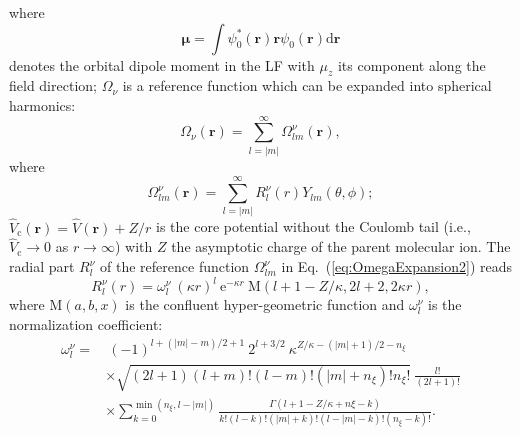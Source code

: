 \documentclass[preprint,12pt]{elsarticle} %
\newcommand{\bn}[1]{\mathbf{#1}}    %
\newcommand{\bi}[1]{\bm{#1}}        %
\renewcommand{\rm}[1]{\mathrm{#1}}    %
\newcommand{\dd}{\mathrm{d}}    %
\newcommand{\ee}{\mathrm{e}}    %
\newcommand{\abs}[1]{\lvert #1 \rvert}  %
\begin{document}
where
\begin{equation}
    \bi{\mu} = \int \psi_0^*(\bn{r}) \bn{r} \psi_0(\bn{r}) \dd \bn{r}
\end{equation}
denotes the orbital dipole moment in the LF with $\mu_z$ its component along the field direction;
$\Omega_\nu$ is a reference function which can be expanded into spherical harmonics:
\begin{equation}
    \Omega_\nu(\bn{r}) = \sum_{l=|m|}^{\infty} \Omega^\nu_{lm}(\bn{r}),
    \label{eq:OmegaExpansion1}
\end{equation}
where
\begin{equation}
    \Omega^\nu_{lm}(\bn{r}) = \sum_{l=|m|}^{\infty} R_l^\nu(r) Y_{lm}(\theta, \phi);
    \label{eq:OmegaExpansion2}
\end{equation}
$\hat{V}_{\rm{c}}(\bn{r}) = \hat{V}(\bn{r}) + Z/r$ is the core potential without the Coulomb tail (i.e., $\hat{V}_{\rm{c}} \rightarrow 0$ as $r\rightarrow \infty$) with $Z$ the asymptotic charge of the parent molecular ion.
The radial part $R_l^\nu$ of the reference function $\Omega_{lm}^\nu$ in Eq.~(\ref{eq:OmegaExpansion2}) reads
\begin{equation}
    R_l^\nu(r)=\omega_l^\nu \ (\kappa r)^l \ \ee^{-\kappa r} \ \rm{M}(l+1-Z/\kappa, 2l+2, 2 \kappa r),
\end{equation}
where $\rm{M}(a, b, x)$ is the confluent hyper-geometric function \cite{olver_nist_2010} and $\omega_l^\nu$ is the normalization coefficient:
\begin{align}
    \omega_l^\nu = & \      (-1)^{l+(\abs{m}-m)/2+1}\ 2^{l+3/2}\ \kappa^{Z/\kappa-(\abs{m}+1)/2-n_\xi} \nonumber \\
                   & \times \sqrt{(2l+1)(l+m)!(l-m)!(\abs{m}+n_\xi)!n_\xi!}\ \frac{l!}{(2l+1)!} \nonumber \\
                   & \times \!\!\!\!\!\! \sum_{k=0}^{\min{(n_\xi,l-\abs{m})}} \!\!\!\!\!\!\!\!\!\! \frac{\Gamma(l+1-Z/\kappa+n\xi-k)}{k!(l-k)!(\abs{m}+k)!(l-\abs{m}-k)!(n_\xi-k)!}.
\end{align}
\end{document}
